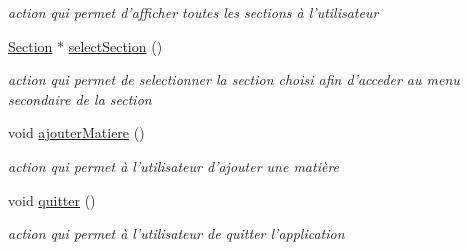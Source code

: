 \begin{DoxyCompactItemize}
\begin{DoxyCompactList}\small\item\em action qui permet d'afficher toutes les sections à l'utilisateur \end{DoxyCompactList}\item 
\hypertarget{class_application_aa8394d87b6d8aeedf585e057ab3b4440}{\hyperlink{class_section}{Section} $\ast$ \hyperlink{class_application_aa8394d87b6d8aeedf585e057ab3b4440}{select\+Section} ()}\label{class_application_aa8394d87b6d8aeedf585e057ab3b4440}

\begin{DoxyCompactList}\small\item\em action qui permet de selectionner la section choisi afin d'acceder au menu secondaire de la section \end{DoxyCompactList}\item 
\hypertarget{class_application_aab7ab676955bd4dc68f1a2fbb59d405a}{void \hyperlink{class_application_aab7ab676955bd4dc68f1a2fbb59d405a}{ajouter\+Matiere} ()}\label{class_application_aab7ab676955bd4dc68f1a2fbb59d405a}

\begin{DoxyCompactList}\small\item\em action qui permet à l'utilisateur d'ajouter une matière \end{DoxyCompactList}\item 
\hypertarget{class_application_a49e81e1531a1a19ff6f422ea6bfd474b}{void \hyperlink{class_application_a49e81e1531a1a19ff6f422ea6bfd474b}{quitter} ()}\label{class_application_a49e81e1531a1a19ff6f422ea6bfd474b}

\begin{DoxyCompactList}\small\item\em action qui permet à l'utilisateur de quitter l'application \end{DoxyCompactList}\end{DoxyCompactItemize}
